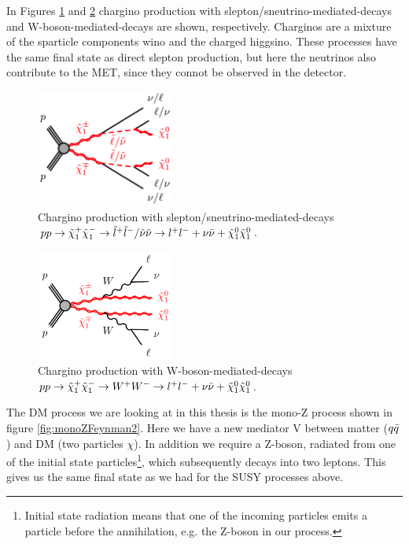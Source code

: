 In Figures \ref{fig:SlepSnuFeynman} and \ref{fig:WWFeynman} chargino production with slepton/sneutrino-mediated-decays and W-boson-mediated-decays are shown, respectively. Charginos are a mixture of the sparticle components wino and the charged higgsino. These processes have the same final state as direct slepton production, but here the neutrinos also contribute to the MET, since they connot be observed in the detector. 
\begin{figure}[H]
    \centering
    \includegraphics[width = 0.4\textwidth]{Figures/FeynmanDiagrams/SlepSnuFeynman.png}
    \caption{Chargino production with slepton/sneutrino-mediated-decays $pp \rightarrow \tilde{\chi}_1^+ \tilde{\chi}_1^- \rightarrow \tilde{l}^+ \tilde{l}^- /\tilde{\nu} \tilde{\nu} \rightarrow l^+l^- + \nu \Bar{\nu} + \tilde{\chi}_1^0 \tilde{\chi}_1^0$.}
    \label{fig:SlepSnuFeynman}
\end{figure}

\begin{figure}[H]
    \centering
    \includegraphics[width = 0.4\textwidth]{Figures/FeynmanDiagrams/WWFeynman.png}
    \caption{Chargino production with W-boson-mediated-decays $pp \rightarrow \tilde{\chi}_1^+ \tilde{\chi}_1^- \rightarrow W^+ W^- \rightarrow l^+l^- + \nu \Bar{\nu} + \tilde{\chi}_1^0 \tilde{\chi}_1^0$.}
    \label{fig:WWFeynman}
\end{figure}

The DM process we are looking at in this thesis is the mono-Z process shown in figure \ref{fig:monoZFeynman2}. Here we have a new mediator V between matter ($q\Bar{q}$) and DM (two particles $\chi$). In addition we require a Z-boson, radiated from one of the initial state particles\footnote{Initial state radiation means that one of the incoming particles emits a particle before the annihilation, e.g. the Z-boson in our process.}, which subsequently decays into two leptons. This gives us the same final state as we had for the SUSY processes above.  

